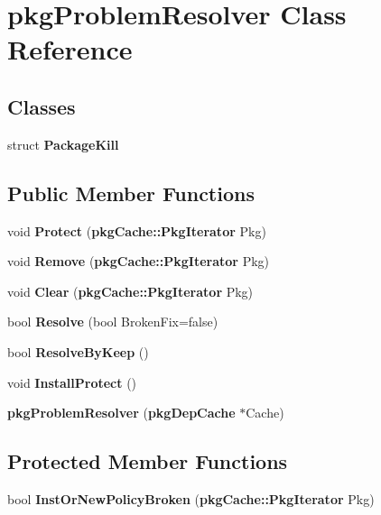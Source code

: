 \section{pkg\-Problem\-Resolver \-Class \-Reference}
\label{classpkgProblemResolver}
\subsection*{\-Classes}
\begin{DoxyCompactItemize}
\item 
struct {\bfseries \-Package\-Kill}
\end{DoxyCompactItemize}
\subsection*{\-Public \-Member \-Functions}
\begin{DoxyCompactItemize}
\item 
void {\bfseries \-Protect} ({\bf pkg\-Cache\-::\-Pkg\-Iterator} \-Pkg)\label{classpkgProblemResolver_aafe1fd6051bdf8b2ff8801e57b4afd0a}

\item 
void {\bfseries \-Remove} ({\bf pkg\-Cache\-::\-Pkg\-Iterator} \-Pkg)\label{classpkgProblemResolver_a99580ec56e81d619c52b764ba38ec278}

\item 
void {\bfseries \-Clear} ({\bf pkg\-Cache\-::\-Pkg\-Iterator} \-Pkg)\label{classpkgProblemResolver_a4d9e1f78be155371c58c12ad50e439d9}

\item 
bool {\bfseries \-Resolve} (bool \-Broken\-Fix=false)\label{classpkgProblemResolver_a934738a8ab2fc19f81c3c8c43797e60e}

\item 
bool {\bfseries \-Resolve\-By\-Keep} ()\label{classpkgProblemResolver_a0828cb58e958149be550fbab08321027}

\item 
void {\bfseries \-Install\-Protect} ()\label{classpkgProblemResolver_a124563cf243dfe0e89a4190d067c1273}

\item 
{\bfseries pkg\-Problem\-Resolver} ({\bf pkg\-Dep\-Cache} $\ast$\-Cache)\label{classpkgProblemResolver_a7867a43973a103ec8d43703bb73a77e4}

\end{DoxyCompactItemize}
\subsection*{\-Protected \-Member \-Functions}
\begin{DoxyCompactItemize}
\item 
bool {\bfseries \-Inst\-Or\-New\-Policy\-Broken} ({\bf pkg\-Cache\-::\-Pkg\-Iterator} \-Pkg)\label{classpkgProblemResolver_a0283277ce988bf89f2c7c5b12e8a0622}

\end{DoxyCompactItemize}


